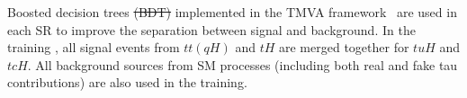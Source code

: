 \documentclass[PAPER, coverpage, atlasdraft=true, texlive=2016, UKenglish]{\ATLASLATEXPATH atlasdoc}
\providecommand{\DIFadd}[1]{{\protect\color{blue}\uwave{#1}}} %
\providecommand{\DIFdel}[1]{{\protect\color{red}\sout{#1}}}                      %
\providecommand{\DIFaddbegin}{} %
\providecommand{\DIFaddend}{} %
\providecommand{\DIFdelbegin}{} %
\providecommand{\DIFdelend}{} %
\begin{document}

Boosted decision trees \DIFdelbegin \DIFdel{(BDT) }\DIFdelend implemented in the TMVA framework~\cite{Hocker:2007ht} are used in each SR to improve the separation between signal and background. 
In the training \DIFaddbegin \DIFadd{process}\DIFaddend , all signal events from $tt(qH)$ and $tH$ are merged together for $tuH$ and $tcH$. All background sources from SM processes
(including both real and fake tau contributions) are also used in the training.
\end{document}
